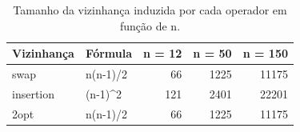 \begin{table}[ht]
\centering
\small
\caption{Tamanho da vizinhança induzida por cada operador em função de n.}
\label{tab:tamanho_vizinhanca}
\begin{tabular}{llrrr}
\hline
Vizinhança & Fórmula & n = 12 & n = 50 & n = 150 \\
\hline
swap & n(n-1)/2 & 66 & 1225 & 11175 \\
\hline
insertion & (n-1)^2 & 121 & 2401 & 22201 \\
\hline
2opt & n(n-1)/2 & 66 & 1225 & 11175 \\
\hline
\end{tabular}
\end{table}

